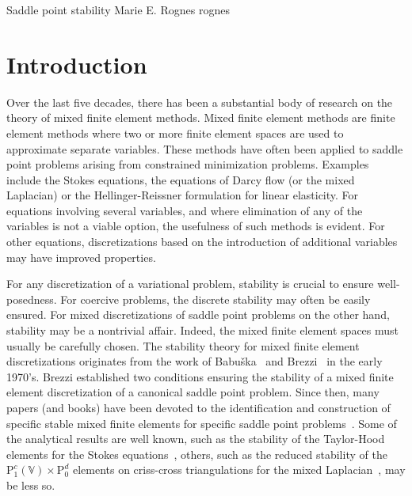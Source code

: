               {Saddle point stability}
              {Marie E. Rognes}
              {rognes}

\newcommand{\rognesforalls}{\forall \;}
\newcommand{\rognesc}{c}
\newcommand{\rognestriang}{\mathcal{T}}
\newcommand{\rognescodeintext}[1]{\texttt{\small #1}}

\newcommand{\rognescg}{\mathrm{P}^c}
\newcommand{\rognesrt}{\mathrm{RT}}
\newcommand{\rognesdg}{\mathrm{P}^d}
\newcommand{\rognesascot}{\projectfont{ASCoT}}
\newcommand{\rognespython}{\projectfont{python}}

\section{Introduction}

Over the last five decades, there has been a substantial body of
research on the theory of mixed finite element methods.  Mixed finite
element methods are finite element methods where two or more finite
element spaces are used to approximate separate variables.  These
methods have often been applied to saddle point problems arising from
constrained minimization problems. Examples include the Stokes
equations, the equations of Darcy flow (or the mixed Laplacian) or the
Hellinger-Reissner formulation for linear elasticity.  For equations
involving several variables, and where elimination of any of the
variables is not a viable option, the usefulness of such methods is
evident. For other equations, discretizations based on the
introduction of additional variables may have improved properties.

For any discretization of a variational problem, stability is crucial
to ensure well-posedness. For coercive problems, the discrete
stability may often be easily ensured. For mixed discretizations of
saddle point problems on the other hand, stability may be a nontrivial
affair. Indeed, the mixed finite element spaces must usually be
carefully chosen. The stability theory for mixed finite element
discretizations originates from the work of Babu\v
ska~\cite{Babuska1973} and Brezzi~\cite{Brezzi1974} in the early
1970's. Brezzi established two conditions ensuring the stability of a
mixed finite element discretization of a canonical saddle point
problem.  Since then, many papers (and books) have been devoted to the
identification and construction of specific stable mixed finite
elements for specific saddle point
problems~\cite{ArnoldFalkWinther2006, BrezziDouglasMarini1985,
BrezziFalk1991, BrezziFortin1991, RaviartThomas1977,
TaylorHood1973}. Some of the analytical results are well known, such
as the stability of the Taylor-Hood elements for the Stokes
equations~\cite{BrezziFalk1991, stenberg:1984, TaylorHood1973},
others, such as the reduced stability of the
$\rognescg_1(\mathbb{V}) \times \rognesdg_0$ elements on criss-cross
triangulations for the mixed Laplacian~\cite{BoffiBrezziGastaldi1999},
may be less so.

